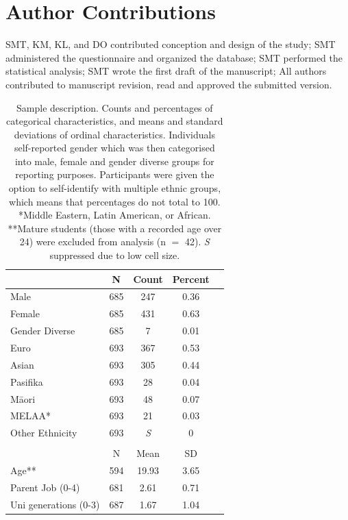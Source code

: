 \section*{Author Contributions}

SMT, KM, KL, and DO contributed conception and design of the study; SMT administered the questionnaire and organized the database; SMT performed the statistical analysis; SMT wrote the first draft of the manuscript; All authors contributed to manuscript revision, read and approved the submitted version.




\begin{table}[ht]
\centering

\begin{tabular}{lcccc}
\hline
& N   & Count & Percent    \\ \hline
Male                                                         & 685 & 247 & 0.36   \\
Female                                                       & 685 & 431 & 0.63   \\
Gender Diverse                                               & 685 & 7 & 0.01   \\
Euro                                                         & 693 & 367 & 0.53   \\
Asian                                                        & 693 & 305 & 0.44   \\
Pasifika                                                      & 693 & 28 & 0.04    \\
M\={a}ori                                                        & 693 & 48 & 0.07 \\
MELAA*                                                        & 693 & 21 & 0.03  \\
Other Ethnicity                                               & 693 & \textit{S} & 0   \\
& & &  \\ \hline
& N & Mean & SD \\\hline 
Age** & 594 & 19.93 & 3.65 \\
Parent Job  (0-4) &  681 & 2.61 & 0.71 \\
Uni generations (0-3)                                        & 687 & 1.67 & 1.04 \\ \hline
\end{tabular}
\caption{Sample description. Counts and percentages of categorical characteristics, and means and standard deviations of ordinal characteristics. Individuals self-reported gender which was then categorised into male, female and gender diverse groups for reporting purposes. Participants were given the option to  self-identify with multiple ethnic groups, which means that percentages do not total to 100.  *Middle Eastern, Latin American, or African. **Mature students (those with a recorded age over 24) were excluded from analysis (n $=$ 42). \textit{S} suppressed due to low cell size.} 
\label{tab:Sample}       %
\end{table}


